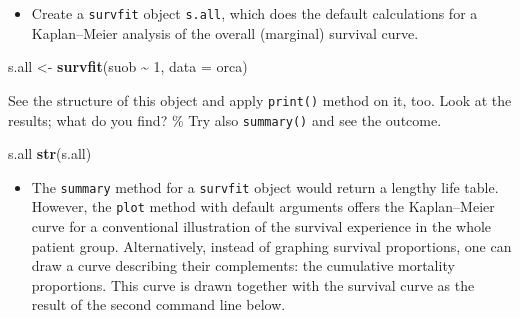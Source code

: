 \documentclass[
]{book}
\newenvironment{Shaded}{\begin{snugshade}}{\end{snugshade}}
\newcommand{\AttributeTok}[1]{\textcolor[rgb]{0.13,0.29,0.53}{#1}}
\newcommand{\DecValTok}[1]{\textcolor[rgb]{0.00,0.00,0.81}{#1}}
\newcommand{\FunctionTok}[1]{\textcolor[rgb]{0.13,0.29,0.53}{\textbf{#1}}}
\newcommand{\NormalTok}[1]{#1}
\newcommand{\OtherTok}[1]{\textcolor[rgb]{0.56,0.35,0.01}{#1}}
\newcommand{\SpecialCharTok}[1]{\textcolor[rgb]{0.81,0.36,0.00}{\textbf{#1}}}
\providecommand{\tightlist}{%
  \setlength{\itemsep}{0pt}\setlength{\parskip}{0pt}}
\begin{document}
\begin{Shaded}
\end{Shaded}

\begin{itemize}
\tightlist
\item
  Create a \texttt{survfit} object \texttt{s.all}, which does the
  default calculations for a Kaplan--Meier
  analysis of the overall (marginal) survival curve.
\end{itemize}

\begin{Shaded}
\begin{Highlighting}[]
\NormalTok{s.all }\OtherTok{\textless{}{-}} \FunctionTok{survfit}\NormalTok{(suob }\SpecialCharTok{\textasciitilde{}} \DecValTok{1}\NormalTok{, }\AttributeTok{data =}\NormalTok{ orca)}
\end{Highlighting}
\end{Shaded}

See the structure of this object and apply \texttt{print()} method on it, too.
Look at the results; what do you find?
\% Try also \texttt{summary()} and see the outcome.

\begin{Shaded}
\begin{Highlighting}[]
\NormalTok{s.all}
\FunctionTok{str}\NormalTok{(s.all)}
\end{Highlighting}
\end{Shaded}

\begin{itemize}
\tightlist
\item
  The \texttt{summary} method for
  a \texttt{survfit} object would return a lengthy life table.
  However, the \texttt{plot} method with default
  arguments offers the Kaplan--Meier curve
  for a conventional illustration of the survival experience in the whole patient group.
  Alternatively, instead of graphing survival proportions,
  one can draw a curve describing their complements: the cumulative mortality proportions. This curve is drawn together with the survival curve as the
  result of the second command line below.
\end{itemize}
\end{document}
